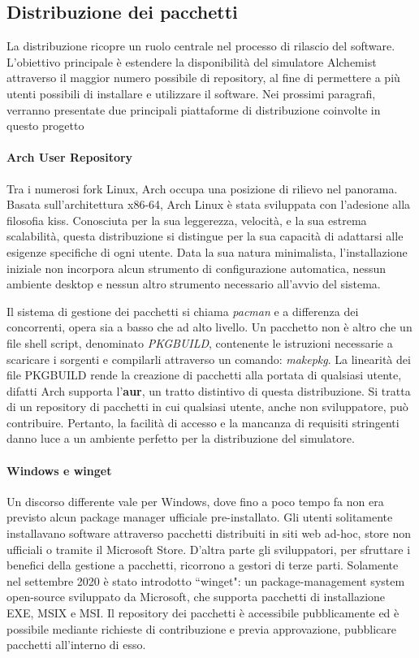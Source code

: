 \subsection{Distribuzione dei pacchetti}

La distribuzione ricopre un ruolo centrale nel processo di rilascio del software. L'obiettivo principale è estendere la disponibilità del simulatore Alchemist attraverso il maggior numero possibile di repository, al fine di permettere a più utenti possibili di installare e utilizzare il software. Nei prossimi paragrafi, verranno presentate due principali piattaforme di distribuzione coinvolte in questo progetto

\paragraph{Arch User Repository} Tra i numerosi fork Linux, Arch occupa una posizione di rilievo nel panorama. Basata sull'architettura x86-64, Arch Linux è stata sviluppata con l'adesione alla filosofia \ac{kiss}. Conosciuta per la sua leggerezza, velocità, e la sua estrema scalabilità, questa distribuzione si distingue per la sua capacità di adattarsi alle esigenze specifiche di ogni utente. Data la sua natura minimalista, l'installazione iniziale non incorpora alcun strumento di configurazione automatica, nessun ambiente desktop e nessun altro strumento necessario all'avvio del sistema. 

Il sistema di gestione dei pacchetti si chiama \textit{pacman} e a differenza dei concorrenti, opera sia a basso che ad alto livello. Un pacchetto non è altro che un file shell script, denominato \textit{PKGBUILD}, contenente le istruzioni necessarie a scaricare i sorgenti e compilarli attraverso un comando: \textit{makepkg}. La linearità dei file PKGBUILD rende la creazione di pacchetti alla portata di qualsiasi utente, difatti Arch supporta l'\textbf{\ac{aur}}, un tratto distintivo di questa distribuzione. Si tratta di un repository di pacchetti in cui qualsiasi utente, anche non sviluppatore, può contribuire. Pertanto, la facilità di accesso e la mancanza di requisiti stringenti danno luce a un ambiente perfetto per la distribuzione del simulatore.

\paragraph{Windows e winget} Un discorso differente vale per Windows, dove fino a poco tempo fa non era previsto alcun package manager ufficiale pre-installato. Gli utenti solitamente installavano software attraverso pacchetti distribuiti in siti web ad-hoc, store non ufficiali o tramite il Microsoft Store. D'altra parte gli sviluppatori, per sfruttare i benefici della gestione a pacchetti, ricorrono a gestori di terze parti. Solamente nel settembre 2020 è stato introdotto ``winget": un package-management system open-source sviluppato da Microsoft, che supporta pacchetti di installazione EXE, MSIX e MSI. Il repository dei pacchetti è accessibile pubblicamente ed è possibile mediante richieste di contribuzione e previa approvazione, pubblicare pacchetti all'interno di esso. \\

